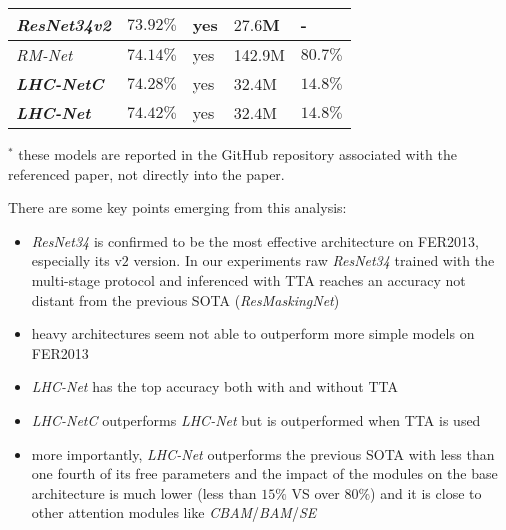 \documentclass[fleqn,10pt]{SelfArx}
\begin{document}
\begin{center}
\begin{tabular}{||p{2.2cm} | p{1.3cm} | p{0.7cm} | p{1.2cm} | p{0.8cm}||}
\hline
\hline
\textit{ResNet34v2}       & \hspace{0.15cm}$73.92\%$               & \hspace{0.12cm}yes   & \hspace{0.12cm}$27.6$M & \hspace{0.4cm}-\\
\hline
\hline
\textit{RM-Net} \cite{resmaskingnet}      & \hspace{0.15cm}$74.14\%$              & \hspace{0.12cm}yes & \hspace{0.05cm}142.9M & $80.7\%$ \\
\hline
\hline
\textbf{\textit{LHC-NetC}}                    & \hspace{0.15cm}$\mathbf{74.28\%}$ & \hspace{0.12cm}yes & \hspace{0.12cm}$32.4$M & $14.8\%$\\
\hline
\hline
\textbf{\textit{LHC-Net}}                      & \hspace{0.15cm}$\mathbf{74.42\%}$ & \hspace{0.12cm}yes & \hspace{0.12cm}$32.4$M & $14.8\%$\\
\hline
\end{tabular}
\end{center}
$^{*}$ these models are reported in the GitHub repository associated with the referenced paper, not directly into the paper.
\

There are some key points emerging from this analysis:
\begin{itemize}
\item \textit{ResNet34} is confirmed to be the most effective architecture on FER2013, especially its v$2$ version. In our experiments raw \textit{ResNet34} trained with the multi-stage protocol and inferenced with TTA reaches an accuracy not distant from the previous SOTA (\textit{ResMaskingNet})
\item heavy architectures seem not able to outperform more simple models on FER2013
\item \textit{LHC-Net} has the top accuracy both with and without TTA
\item \textit{LHC-NetC} outperforms \textit{LHC-Net} but is outperformed when TTA is used
\item more importantly, \textit{LHC-Net} outperforms the previous SOTA with less than one fourth of its free parameters and the impact of the  modules on the base architecture is much lower (less than $15\%$ VS over $80\%$) and it is close to other attention modules like \textit{CBAM}/\textit{BAM}/\textit{SE}
\end{itemize}
\end{document}
